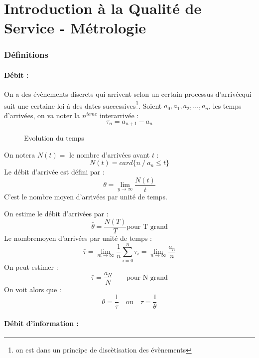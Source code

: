 \documentclass[a4paper, 11pt, fleqn]{article}
\newcommand{\qos}[0]{Qualité de Service }
\begin{document}
\part{Introduction à la \qos - Métrologie}

\section{Définitions}

\subsection{Débit :}

On a des évènements discrets qui arrivent selon un certain processus
d'arrivéequi suit une certaine loi à des dates successives\footnote{on est dans un principe de
discètisation des évènements}. Soient $ \displaystyle a_0, a_1, a_2, \dots, a_n $, les temps
d'arrivées, on va noter la $n^{ieme}$ interarrivée : $$
\tau_n = a_{n+1} - a_n $$
\begin{figure}[h!]
	\begin{center}
	\end{center}
	\caption{Evolution du temps}
\end{figure}

On notera $N(t) = $ le nombre d'arrivées avant $t$ : $$
N(t) = card \{ n\ /\ a_n \leq t \} $$
Le débit d'arrivée est défini par : $$
\theta = \lim_{y \rightarrow \infty} \frac{N(t)}{t} $$
C'est le nombre moyen d'arrivées par unité de temps.

On estime le débit d'arrivées par :
$$ \bar\theta = \frac{N(T)}{T} \mbox{pour T grand} $$
Le nombremoyen d'arrivées par unité de temps : $$
\bar\tau = \lim_{m \rightarrow \infty} \frac{1}{n} \sum_{i=0}^{n} \tau_i = \lim_{n \rightarrow
\infty} \frac{a_n}{n} $$
On peut estimer : $$
\bar\tau = \frac{a_N}{N} \quad \quad \mbox{pour N grand} $$
On voit alors que : $$
\theta = \frac{1}{\tau} \quad \mbox{ou} \quad \tau = \frac{1}{\theta} $$

\subsection{Débit d'information :} 
\end{document}
